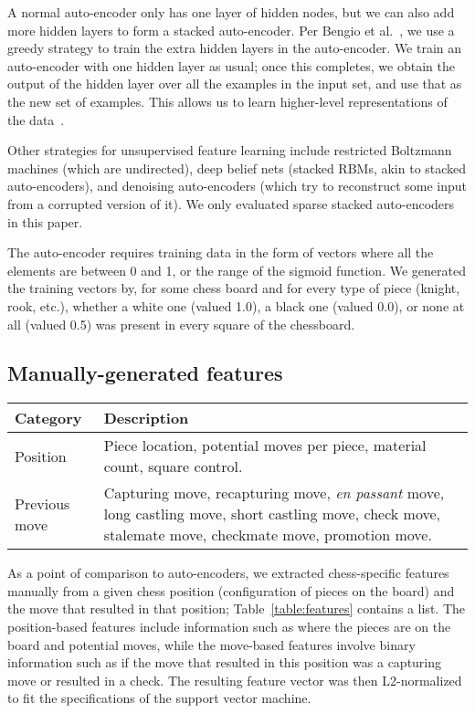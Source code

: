 \documentclass[11pt]{article}
\begin{document}
A normal auto-encoder only has one layer of hidden nodes, but we can 
also add more hidden layers to form a stacked auto-encoder. Per Bengio 
et al.~, we use a greedy strategy to 
train the extra hidden layers in the auto-encoder. We train an 
auto-encoder with one hidden layer as usual; once this completes, we 
obtain the output of the hidden layer over all the examples in the input 
set, and use that as the new set of examples. This allows us to learn 
higher-level representations of the data~\cite{Vincent}.

Other strategies for unsupervised feature learning include restricted 
Boltzmann machines (which are undirected), deep belief nets (stacked 
RBMs, akin to stacked auto-encoders), and denoising auto-encoders (which 
try to reconstruct some input from a corrupted version of it). We only 
evaluated sparse stacked auto-encoders in this paper.

The auto-encoder requires training data in the form of vectors where all 
the elements are between 0 and 1, or the range of the sigmoid function. 
We generated the training vectors by, for some chess board and for every 
type of piece (knight, rook, etc.), whether a white one (valued 1.0), a 
black one (valued 0.0), or none at all (valued 0.5) was present in every 
square of the chessboard.

\subsection{Manually-generated features}
\begin{table*}
\centering
\begin{tabular}{lp{}}
\hline
\textbf{Category} & \textbf{Description} \\ \hline
Position & Piece location, potential moves per piece, material count, 
square control. \\
Previous move & Capturing move, recapturing move, \emph{en passant} 
move, long castling move, short castling move, check move, stalemate 
move, checkmate move, promotion move. \\
\hline
\end{tabular} 
\caption{List of chess-specific manual features per position.}
\label{table:features}
\end{table*}

As a point of comparison to auto-encoders, we extracted chess-specific 
features manually from a given chess position (configuration of pieces 
on the board) and the move that resulted in that position; 
Table~\ref{table:features} contains a list. The position-based features 
include information such as where the pieces are on the board and 
potential moves, while the move-based features involve binary 
information such as if the move that resulted in this position was a 
capturing move or resulted in a check.  The resulting feature vector was 
then L2-normalized to fit the specifications of the support vector 
machine.
\end{document}
